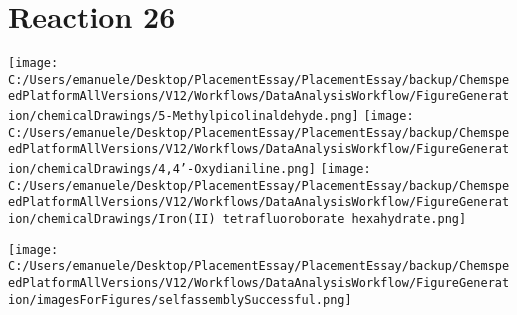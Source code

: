 \documentclass{article}%
\begin{document}
\section*{Reaction 26}%
%
\begin{scheme}[H]%
\begin{minipage}{0.5\textwidth}%
\texttt{[image: C:/Users/emanuele/Desktop/PlacementEssay/PlacementEssay/backup/ChemspeedPlatformAllVersions/V12/Workflows/DataAnalysisWorkflow/FigureGeneration/chemicalDrawings/5-Methylpicolinaldehyde.png]}%
\texttt{[image: C:/Users/emanuele/Desktop/PlacementEssay/PlacementEssay/backup/ChemspeedPlatformAllVersions/V12/Workflows/DataAnalysisWorkflow/FigureGeneration/chemicalDrawings/4,4'-Oxydianiline.png]}%
\texttt{[image: C:/Users/emanuele/Desktop/PlacementEssay/PlacementEssay/backup/ChemspeedPlatformAllVersions/V12/Workflows/DataAnalysisWorkflow/FigureGeneration/chemicalDrawings/Iron(II) tetrafluoroborate hexahydrate.png]}%
\end{minipage}%
\begin{minipage}{0.5\textwidth}%
\begin{center}%
\texttt{[image: C:/Users/emanuele/Desktop/PlacementEssay/PlacementEssay/backup/ChemspeedPlatformAllVersions/V12/Workflows/DataAnalysisWorkflow/FigureGeneration/imagesForFigures/selfassemblySuccessful.png]}%
\end{center}%
\end{minipage}%
\caption{Self-assembly of components 3, 15, with Iron(II) in a 3.0:1.5:1.0 molar ratio in CH$_3$CN at 60\textdegree C for 40h. These are the reagents (starting materials) for reaction 26.}%
\end{scheme}%
\end{document}
